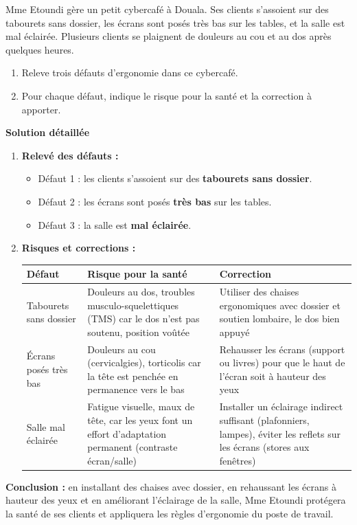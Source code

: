 \documentclass[11pt]{article}
\newcommand{\cle}[1]{{\popxbold\color{popdark}#1}}
\begin{document}
\begin{exoresolu}
Mme Etoundi gère un petit cybercafé à Douala. Ses clients s'assoient sur des tabourets sans dossier, les écrans sont posés très bas sur les tables, et la salle est mal éclairée. Plusieurs clients se plaignent de douleurs au cou et au dos après quelques heures.
\begin{enumerate}
\item Releve trois défauts d'ergonomie dans ce cybercafé.
\item Pour chaque défaut, indique le risque pour la santé et la correction à apporter.
\end{enumerate}
\tcblower
\textbf{Solution détaillée}
\begin{enumerate}
\item \textbf{Relevé des défauts :}
\begin{itemize}
\item Défaut 1 : les clients s'assoient sur des \textbf{tabourets sans dossier}.
\item Défaut 2 : les écrans sont posés \textbf{très bas} sur les tables.
\item Défaut 3 : la salle est \textbf{mal éclairée}.
\end{itemize}
\item \textbf{Risques et corrections :}
\begin{center}
\begin{tabularx}{\linewidth}{|X|X|X|}
\hline
\rowcolor{popblueL} \textbf{Défaut} & \textbf{Risque pour la santé} & \textbf{Correction} \\
\hline
Tabourets sans dossier & Douleurs au dos, \cle{troubles musculo-squelettiques (TMS)} car le dos n'est pas soutenu, position voûtée & Utiliser des chaises ergonomiques avec dossier et soutien lombaire, le dos bien appuyé \\
\hline
Écrans posés très bas & Douleurs au cou (\cle{cervicalgies}), torticolis car la tête est penchée en permanence vers le bas & Rehausser les écrans (support ou livres) pour que le haut de l'écran soit à hauteur des yeux \\
\hline
Salle mal éclairée & \cle{Fatigue visuelle}, maux de tête, car les yeux font un effort d'adaptation permanent (contraste écran/salle) & Installer un éclairage indirect suffisant (plafonniers, lampes), éviter les reflets sur les écrans (stores aux fenêtres) \\
\hline
\end{tabularx}
\end{center}
\end{enumerate}
\textbf{Conclusion :} en installant des chaises avec dossier, en rehaussant les écrans à hauteur des yeux et en améliorant l'éclairage de la salle, Mme Etoundi protégera la santé de ses clients et appliquera les règles d'ergonomie du poste de travail.
\end{exoresolu}
\end{document}
